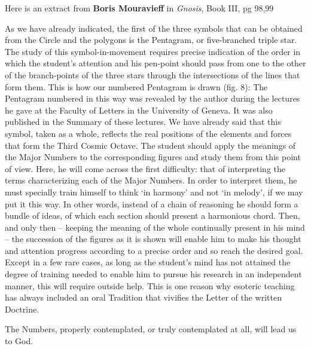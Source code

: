 Here is an extract from \textbf{Boris Mouravieff} in \emph{Gnosis}, Book III, pg 98,99

\begin{quotex}
As we have already indicated, the first of the three symbols that can be obtained from the Circle and the polygons is the Pentagram, or five-branched triple star. The study of this symbol-in-movement requires precise indication of the order in which the student's attention and his pen-point should pass from one to the other of the branch-points of the three stars through the intersections of the lines that form them. This is how our numbered Pentagram is drawn (fig. 8): The Pentagram numbered in this way was revealed by the author during the lectures he gave at the Faculty of Letters in the University of Geneva. It was also published in the Summary of these lectures. We have already said that this symbol, taken as a whole, reflects the real positions of the elements and forces that form the Third Cosmic Octave. The student should apply the meanings of the Major Numbers to the corresponding figures and study them from this point of view. Here, he will come across the first difficulty: that of interpreting the terms characterizing each of the Major Numbers. In order to interpret them, he must specially train himself to think `in harmony' and not `in melody', if we may put it this way. In other words, instead of a chain of reasoning he should form a bundle of ideas, of which each section should present a harmonious chord. Then, and only then -- keeping the meaning of the whole continually present in his mind -- the succession of the figures as it is shown will enable him to make his thought and attention progress according to a precise order and so reach the desired goal. Except in a few rare cases, as long as the student's mind has not attained the degree of training needed to enable him to pursue his research in an independent manner, this will require outside help. This is one reason why esoteric teaching has always included an oral Tradition that vivifies the Letter of the written Doctrine.
\end{quotex}


The Numbers, properly contemplated, or truly contemplated at all, will lead us to God.



